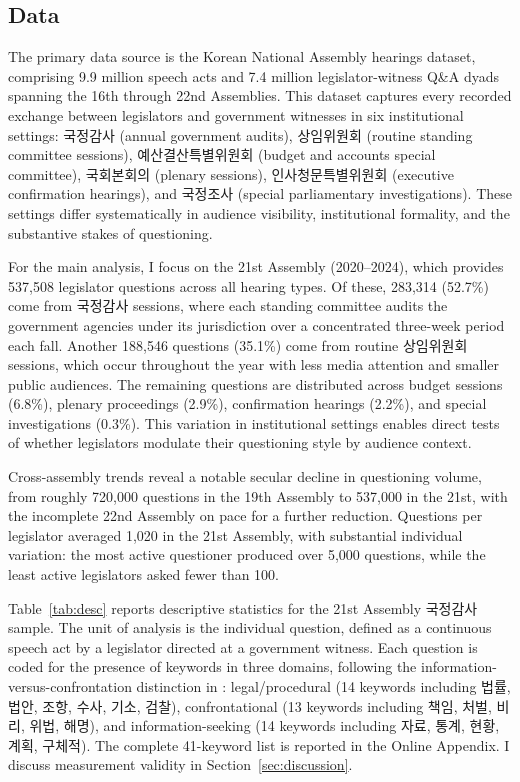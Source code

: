 \documentclass[11pt]{article}
\begin{document}
\subsection{Data}

The primary data source is the Korean National Assembly hearings dataset, comprising 9.9 million speech acts and 7.4 million legislator-witness Q\&A dyads spanning the 16th through 22nd Assemblies. This dataset captures every recorded exchange between legislators and government witnesses in six institutional settings: 국정감사 (annual government audits), 상임위원회 (routine standing committee sessions), 예산결산특별위원회 (budget and accounts special committee), 국회본회의 (plenary sessions), 인사청문특별위원회 (executive confirmation hearings), and 국정조사 (special parliamentary investigations). These settings differ systematically in audience visibility, institutional formality, and the substantive stakes of questioning.

For the main analysis, I focus on the 21st Assembly (2020--2024), which provides 537,508 legislator questions across all hearing types. Of these, 283,314 (52.7\%) come from 국정감사 sessions, where each standing committee audits the government agencies under its jurisdiction over a concentrated three-week period each fall. Another 188,546 questions (35.1\%) come from routine 상임위원회 sessions, which occur throughout the year with less media attention and smaller public audiences. The remaining questions are distributed across budget sessions (6.8\%), plenary proceedings (2.9\%), confirmation hearings (2.2\%), and special investigations (0.3\%). This variation in institutional settings enables direct tests of whether legislators modulate their questioning style by audience context.

Cross-assembly trends reveal a notable secular decline in questioning volume, from roughly 720,000 questions in the 19th Assembly to 537,000 in the 21st, with the incomplete 22nd Assembly on pace for a further reduction. Questions per legislator averaged 1,020 in the 21st Assembly, with substantial individual variation: the most active questioner produced over 5,000 questions, while the least active legislators asked fewer than 100.

Table~\ref{tab:desc} reports descriptive statistics for the 21st Assembly 국정감사 sample. The unit of analysis is the individual question, defined as a continuous speech act by a legislator directed at a government witness. Each question is coded for the presence of keywords in three domains, following the information-versus-confrontation distinction in \citet{eldes2024}: legal/procedural (14 keywords including 법률, 법안, 조항, 수사, 기소, 검찰), confrontational (13 keywords including 책임, 처벌, 비리, 위법, 해명), and information-seeking (14 keywords including 자료, 통계, 현황, 계획, 구체적). The complete 41-keyword list is reported in the Online Appendix. I discuss measurement validity in Section~\ref{sec:discussion}.
\end{document}
